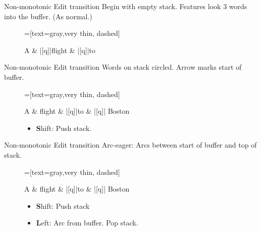 \documentclass[color=usenames,dvipsnames]{lecture}
\begin{document}
\begin{plain}{Non-monotonic Edit transition}
Begin with empty stack. Features look 3 words into the buffer. (As normal.)
\begin{figure}
    \centering
    \begin{dependency}[theme=simple]
    =[text=gray,very thin, dashed]
    \begin{deptext}[column sep=.075cm, row sep=.1ex]
        A \& |[q]|flight \& |[q]|to \\
    \end{deptext}
\end{dependency}

\end{figure}
\end{plain}


\begin{plain}{Non-monotonic Edit transition}
Words on stack circled. Arrow marks start of buffer.
\begin{figure}
    \centering
    \begin{dependency}[theme=simple]
    =[text=gray,very thin, dashed]
    \begin{deptext}[column sep=.075cm, row sep=.1ex]
        A \& flight \& |[q]|to \& |[q]| Boston \\
    \end{deptext}
\end{dependency}

\begin{itemize}
  \item \textbf{S}hift: Push stack.
\end{itemize}

\end{figure}
\end{plain}


\begin{plain}{Non-monotonic Edit transition}
Arc-eager: Arcs between start of buffer and top of stack.
\begin{figure}
    \centering
    \begin{dependency}[theme=simple]
    =[text=gray,very thin, dashed]
    \begin{deptext}[column sep=.075cm, row sep=.1ex]
        A \& flight \& |[q]|to \& |[q]| Boston \\
    \end{deptext}
\end{dependency}

\begin{itemize}
  \item \textbf{S}hift: Push stack
  \item \textbf{L}eft: Arc from buffer. Pop stack.
\end{itemize}

\end{figure}
\end{plain}
\end{document}

